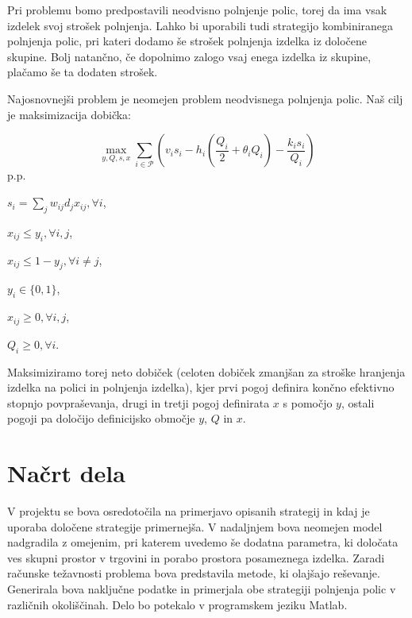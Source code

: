 \documentclass[a4paper]{article}
\begin{document}
Pri problemu bomo predpostavili neodvisno polnjenje polic, torej da  ima vsak izdelek svoj strošek polnjenja. Lahko bi uporabili tudi strategijo kombiniranega polnjenja polic, pri kateri dodamo še strošek polnjenja izdelka iz določene skupine. Bolj natančno, če dopolnimo zalogo vsaj enega izdelka iz skupine, plačamo še ta dodaten strošek.


Najosnovnejši problem je neomejen problem neodvisnega polnjenja polic. Naš cilj je maksimizacija dobička:

$$  \max_{y, Q,  s, x}  \sum_{i \in \mathcal{P}} ( v_i s_ i - h_i (\frac{Q_i }{ 2} + \theta_i Q_i) - \frac{k_i s_i}{Q_i})   $$ 
p.p.

 $ s_i = \sum_j w_{ij} d_j x_{ij}, \forall i$,

$ x_{ij} \leq y_i, \forall i, j  $,

$ x_{ij} \leq 1 - y_j, \forall i \ne j$,

$ y_i \in \{0,1\}$,

$ x_{ij} \geq 0, \forall i,j$,

$Q_i \geq 0, \forall i$.

\vspace*{4 mm}
Maksimiziramo torej neto dobiček (celoten dobiček zmanjšan za stroške hranjenja izdelka na polici in polnjenja izdelka), kjer prvi pogoj definira končno efektivno stopnjo povpraševanja, drugi in tretji pogoj definirata $x$ s pomočjo $y$, ostali pogoji pa določijo definicijsko območje $y$, $Q$ in $x$.

 
\section{Načrt dela}

V projektu se bova osredotočila na primerjavo opisanih strategij in kdaj je uporaba določene strategije primernejša. V nadaljnjem bova neomejen model nadgradila z omejenim, pri katerem uvedemo še dodatna parametra, ki določata ves skupni prostor v trgovini in porabo prostora posameznega izdelka. Zaradi računske težavnosti problema bova predstavila metode, ki olajšajo reševanje. Generirala bova naključne podatke in primerjala obe strategiji polnjenja polic v različnih okoliščinah. Delo bo potekalo v programskem jeziku Matlab.


	
\end{document}
